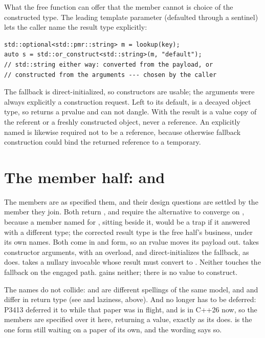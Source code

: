 \documentclass[a4paper,10pt,oneside,openany,final,article]{memoir}
\begin{document}
What the free function can offer that the member cannot is choice of the
constructed type. The leading  template parameter (defaulted
through a  sentinel) lets the caller name the result type
explicitly:

\begin{verbatim}
std::optional<std::pmr::string> m = lookup(key);
auto s = std::or_construct<std::string>(m, "default");
// std::string either way: converted from the payload, or
// constructed from the arguments --- chosen by the caller
\end{verbatim}

The fallback is direct-initialized, so  constructors are
usable; the arguments were always explicitly a construction request. Left to
its default,  is a decayed object type, so 
returns a prvalue and can not dangle. With  the result
is a value copy of the referent or a freshly constructed object, never a
reference. An explicitly named  is likewise required not to be a
reference, because otherwise fallback construction could bind the returned
reference to a temporary.

\section{The member half:  and }

The members are as \cite{P3413R0} specified them, and their design questions
are settled by the member they join. Both return , and require the
alternative to converge on , because a member named for
, sitting beside it, would be a trap if it answered with a
different type; the corrected result type is the free half's business, under
its own names. Both come in  and \tcode{\&\&} form, so an
rvalue moves its payload out.  takes constructor
arguments, with an  overload, and direct-initializes
the fallback, as  does.  takes a
nullary invocable whose result must convert to . Neither touches
the fallback on the engaged path.  gains neither;
there is no value to construct.

The names do not collide:
 and 
are different spellings of the same model, and 
and  differ in return type (see  and
laziness, above). And  no longer
has to be deferred: P3413 deferred it to \cite{P2988R12} while that paper
was in flight, and  is in C++26 now, so the members are
specified over it here, returning a value, exactly as its 
does.  is the one form still waiting on a paper of
its own, and the wording says so.
\end{document}
